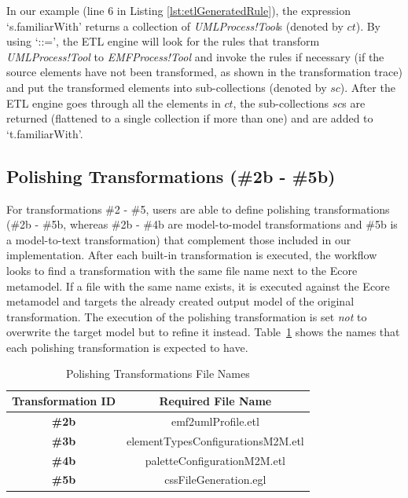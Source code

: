 In our example (line 6 in Listing \ref{lst:etlGeneratedRule}), the expression `s.familiarWith' returns a collection of \emph{UMLProcess!Tool}s (denoted by $ct$). By using `::=', the ETL engine will look for the rules that transform \emph{UMLProcess!Tool} to \emph{EMFProcess!Tool} and invoke the rules if 
necessary (if the source elements have not been transformed, as shown in the transformation trace) and put the transformed elements into sub-collections 
(denoted by $sc$). 
After the ETL engine goes through all the elements in $ct$, the sub-collections $sc$s are returned (flattened to a single collection if more than one) and are added to `t.familiarWith'.


\vspace{5mm}
\subsection{Polishing Transformations (\#2b - \#5b)} 
\label{sec:transformationPatches}

For transformations \#2 - \#5, users are able to define polishing transformations (\#2b - \#5b, whereas \#2b - \#4b are model-to-model transformations and \#5b is a model-to-text transformation) that complement those included in our implementation. 
After each built-in transformation is executed, the workflow looks to find a transformation with the same file name next to the Ecore metamodel. 
If a file with the same name exists, it is executed against the Ecore metamodel and targets the already created output model of the original transformation. 
The execution of the polishing transformation is set \textit{not} to overwrite the target model but to refine it instead.
Table~\ref{tab:polishingTransformationsNames} shows the names that each polishing transformation is expected to have.

\begin{table}[ht!]
	\centering
	\begin{tabular}{|c|c|}
		\cline{1-2}
		\textbf{Transformation ID}  & \textbf{Required File Name}\\ \hline
		\textbf{\#2b} & emf2umlProfile.etl\\ \hline
		\textbf{\#3b} & elementTypesConfigurationsM2M.etl\\ \hline
		\textbf{\#4b} & paletteConfigurationM2M.etl\\ \hline
		\textbf{\#5b} & cssFileGeneration.egl\\ \hline
		\cline{1-2}
	\end{tabular}
	\caption{Polishing Transformations File Names}
	\label{tab:polishingTransformationsNames}
\end{table}



